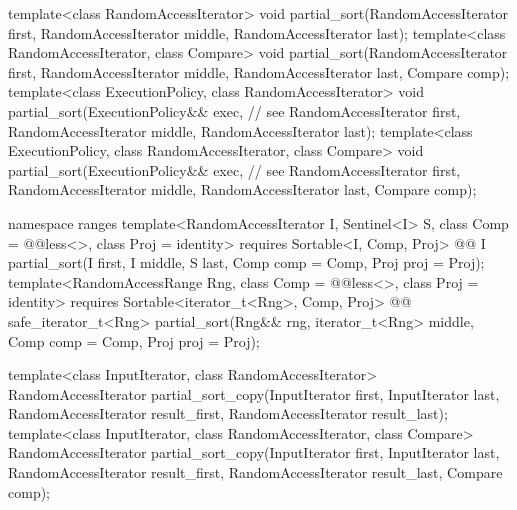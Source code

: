 \begin{codeblock}
  template<class RandomAccessIterator>
    void partial_sort(RandomAccessIterator first,
                      RandomAccessIterator middle,
                      RandomAccessIterator last);
  template<class RandomAccessIterator, class Compare>
    void partial_sort(RandomAccessIterator first,
                      RandomAccessIterator middle,
                      RandomAccessIterator last, Compare comp);
  template<class ExecutionPolicy, class RandomAccessIterator>
    void partial_sort(ExecutionPolicy&& exec, // see 
                      RandomAccessIterator first,
                      RandomAccessIterator middle,
                      RandomAccessIterator last);
  template<class ExecutionPolicy, class RandomAccessIterator, class Compare>
    void partial_sort(ExecutionPolicy&& exec, // see 
                      RandomAccessIterator first,
                      RandomAccessIterator middle,
                      RandomAccessIterator last, Compare comp);
\end{codeblock}\begin{addedblock}\begin{codeblock}
  namespace ranges {
    template<RandomAccessIterator I, Sentinel<I> S, class Comp = @@less<>,
        class Proj = identity>
      requires Sortable<I, Comp, Proj>
      @@ I
        partial_sort(I first, I middle, S last, Comp comp = Comp{}, Proj proj = Proj{});
    template<RandomAccessRange Rng, class Comp = @@less<>, class Proj = identity>
      requires Sortable<iterator_t<Rng>, Comp, Proj>
      @@ safe_iterator_t<Rng>
        partial_sort(Rng&& rng, iterator_t<Rng> middle, Comp comp = Comp{},
                     Proj proj = Proj{});
  }
\end{codeblock}\end{addedblock}\begin{codeblock}
  template<class InputIterator, class RandomAccessIterator>
    RandomAccessIterator
      partial_sort_copy(InputIterator first, InputIterator last,
                        RandomAccessIterator result_first,
                        RandomAccessIterator result_last);
  template<class InputIterator, class RandomAccessIterator, class Compare>
    RandomAccessIterator
      partial_sort_copy(InputIterator first, InputIterator last,
                        RandomAccessIterator result_first,
                        RandomAccessIterator result_last,
                        Compare comp);

\end{codeblock}
